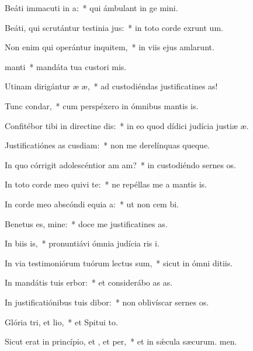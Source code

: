 \item Beáti immacuti in a:~* qui ámbulant in ge mini.
\item Beáti, qui scrutántur testinia jus:~* in toto corde exrunt um.
\item Non enim qui operántur inquitem,~* in viis ejus amlarunt.
\item {} manti~* mandáta tua custori mis.
\item Utinam dirigántur æ æ,~* ad custodiéndas justificatines as!
\item Tunc  condar,~* cum perspéxero in ómnibus mantis is.
\item Confitébor tibi in directine dis:~* in eo quod dídici judícia justiæ æ.
\item Justificatiónes as cusdiam:~* non me derelínquas queque.
\item In quo córrigit adolescéntior am am?~* in custodiéndo sernes os.
\item In toto corde meo quivi te:~* ne repéllas me a mantis is.
\item In corde meo abscóndi equia a:~* ut non cem bi.
\item Benetus es, mine:~* doce me justificatines as.
\item In biis is,~* pronuntiávi ómnia judícia ris i.
\item In via testimoniórum tuórum lectus sum,~* sicut in ómni ditiis.
\item In mandátis tuis erbor:~* et considerábo as as.
\item In justificatiónibus tuis dibor:~* non oblivíscar sernes os.
\item Glória tri, et lio,~* et Spitui to.
\item Sicut erat in princípio, et , et per,~* et in sǽcula sæcurum. men.

